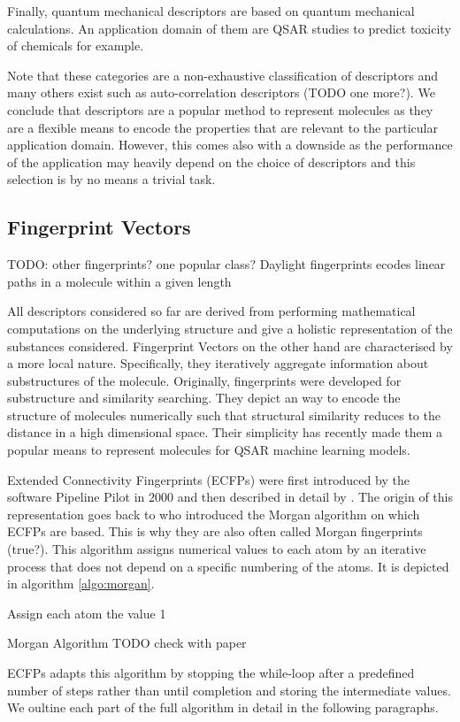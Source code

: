 Finally, quantum mechanical descriptors are based on quantum mechanical calculations. An application domain of them are QSAR studies \citep{REENU201589, eroglu2007dft, senior2011qstr} to predict toxicity of chemicals for example.

Note that these categories are a non-exhaustive classification of descriptors and many others exist such as auto-correlation descriptors \citep{broto1984molecular} (TODO one more?). We conclude that descriptors are a popular method to represent molecules as they are a flexible means to encode the properties that are relevant to the particular application domain. However, this comes also with a downside as the performance of the application may heavily depend on the choice of descriptors and this selection is by no means a trivial task.

\subsection{Fingerprint Vectors}
TODO: other fingerprints? one popular class? Daylight fingerprints ecodes linear paths in a molecule within a given length

All descriptors considered so far are derived from performing mathematical computations on the underlying structure and give a holistic representation of the substances considered. Fingerprint Vectors on the other hand are characterised by a more local nature. Specifically, they iteratively aggregate information about substructures of the molecule. Originally, fingerprints were developed for substructure and similarity searching. They depict an way to encode the structure of molecules numerically such that structural similarity reduces to the distance in a high dimensional space. Their simplicity has recently made them a popular means to represent molecules for QSAR machine learning models. 

Extended Connectivity Fingerprints (ECFPs) were first introduced by the software Pipeline Pilot in 2000 and then described in detail by \cite{ECFP}. The origin of this representation goes back to \cite{morgan} who introduced the Morgan algorithm on which ECFPs are based. This is why they are also often called Morgan fingerprints (true?). This algorithm assigns numerical values to each atom by an iterative process that does not depend on a specific numbering of the atoms. It is depicted in algorithm \ref{algo:morgan}.

\begin{algorithm}[t]
	\SetAlgoLined
	Assign each atom the value 1\;
	\caption{Morgan Algorithm TODO check with paper}
	\label{algo:morgan}
\end{algorithm}
ECFPs adapts this algorithm by stopping the while-loop after a predefined number of steps rather than until completion and storing the intermediate values. We oultine each part of the full algorithm in detail in the following paragraphs.

